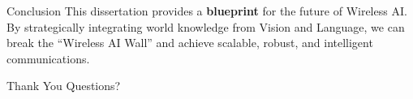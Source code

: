 \begin{frame}{Conclusion}
    \centering
    \Large
    This dissertation provides a \textbf{blueprint} for the future of Wireless AI.
    \vspace{0.5cm}
    \normalsize
    By strategically integrating world knowledge from Vision and Language, we can break the ``Wireless AI Wall'' and achieve scalable, robust, and intelligent communications.
\end{frame}

\begin{frame}
    \centering
    \Huge
    Thank You
    \vspace{1cm}
    \normalsize
    Questions?
\end{frame}

